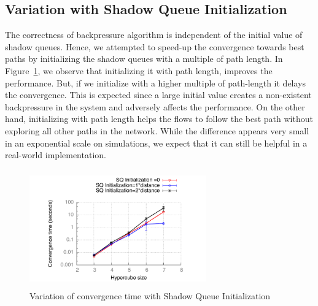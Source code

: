 \subsection{Variation with Shadow Queue Initialization}
The correctness of backpressure algorithm is independent of the initial value of shadow queues. Hence, we attempted to speed-up the convergence towards best paths by initializing the shadow queues with a multiple of path length. In Figure~\ref{fig:SQ}, we observe that initializing it with path length, improves the performance. But, if we initialize with a higher multiple of path-length it delays the convergence. This is expected since a large initial value creates a non-existent backpressure in the system and adversely affects the performance. On the other hand, initializing with path length helps the flows to follow the best path without exploring all other paths in the network. While the difference appears very small in an exponential scale on simulations, we expect that it can still be helpful in a real-world implementation.

\begin{figure}
\centering
\includegraphics[width=3in, height=2in]{./figures/SQ.pdf}
\caption{\small Variation of convergence time with Shadow Queue Initialization}
\label{fig:SQ}
\end{figure}

